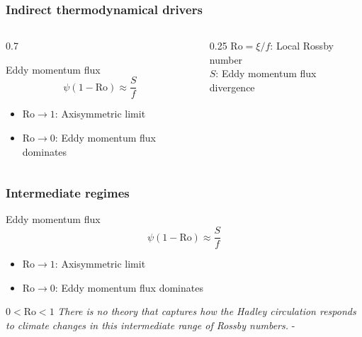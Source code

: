 \documentclass{beamer}
\begin{document}
\begin{frame}
    \frametitle{Indirect thermodynamical drivers}
\begin{columns}
\begin{column}{0.7\textwidth}
    \begin{block}{Eddy momentum flux}
        \begin{equation}
            \psi(1-\mathrm{Ro})\approx \frac{S}{f}
        \end{equation}
        \begin{itemize}
            \item $\mathrm{Ro}\rightarrow 1$: Axisymmetric limit
            \item $\mathrm{Ro}\rightarrow 0$: Eddy momentum flux dominates
        \end{itemize}
    \end{block}
\end{column}
\begin{column}{0.25\textwidth}  %
    $\mathrm{Ro}=\xi/f$: Local Rossby number \\
    $S$: Eddy momentum flux divergence
\end{column}
\end{columns}
\end{frame}

\begin{frame}
    \frametitle{Intermediate regimes}
    \begin{block}{Eddy momentum flux}
        \begin{equation*}
            \psi(1-\mathrm{Ro})\approx \frac{S}{f}
        \end{equation*}
        \begin{itemize}
            \item $\mathrm{Ro}\rightarrow 1$: Axisymmetric limit
            \item $\mathrm{Ro}\rightarrow 0$: Eddy momentum flux dominates
        \end{itemize}
    \end{block}

    \begin{alertblock}{$0<\mathrm{Ro}<1$}
        \textit{There is no theory that captures how the Hadley circulation responds to climate
changes in this intermediate range of Rossby numbers.} - \cite{LevineSchneider2011}
        
    \end{alertblock}

\end{frame}
\end{document}
